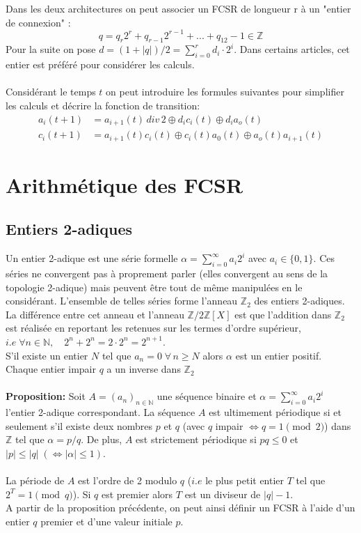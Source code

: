 \documentclass[11pt]{report}
\begin{document}
	Dans les deux architectures on peut associer un FCSR de longueur r à un "entier de connexion" : 
	$$
	q = q_r2^r + q_{r-1}2^{r-1} + ... + q_12 - 1 \in 
	\mathbb{Z}
	$$
	Pour la suite on pose $d = (1+|q|)/2 = \sum_{i=0}^rd_i \cdot 2^i$. Dans certains articles, cet entier est préféré pour considérer les calculs.
	\\\\
	Considérant le temps $t$ on peut introduire les formules suivantes pour simplifier les calculs et décrire la fonction de transition: 
	\begin{align*}
		a_i(t+1) &= a_{i+1}(t) \, div \, 2 \oplus d_ic_i(t) \oplus d_ia_o(t)\\
		c_i(t+1) &= a_{i+1}(t)c_i(t) \oplus c_i(t)a_0(t) \oplus a_o(t)a_{i+1}(t)
	\end{align*}
		
\chapter{Arithmétique des FCSR}	
	\section{Entiers 2-adiques}
	
	Un entier 2-adique est une série formelle $\alpha = \sum_{i=0}^\infty a_i2^i$ avec $a_i \in \{0,1\}$.
	Ces séries ne convergent pas à proprement parler (elles convergent au sens de la topologie 2-adique) mais peuvent être tout de même manipulées en le considérant. L'ensemble de telles séries forme l'anneau $\mathbb{Z}_2$ des entiers 2-adiques. La différence entre cet anneau et l'anneau $\mathbb{Z}/2\mathbb{Z}[X]$ est que l'addition dans $\mathbb{Z}_2$ est réalisée en reportant les retenues sur les termes d'ordre supérieur, $i.e\;\forall n \in \mathbb{N},\quad 2^n+2^n = 2 \cdot 2^n = 2^{n+1}$.
	\\
	S'il existe un entier $N$ tel que $a_n=0 \; \forall \, n \geq N$ alors $\alpha$ est un entier positif. Chaque entier impair $q$ a un inverse dans $\mathbb{Z}_2$
	\\
	\\
	\textbf{Proposition:} Soit $A=(a_n)_{n \in \mathbb{N}}$ une séquence binaire et $\alpha = \sum_{i=0}^\infty a_i2^i$ l'entier 2-adique correspondant. La séquence $A$ est ultimement périodique si et seulement s'il existe deux nombres $p$ et $q$ (avec $q$ impair $\iff q=1\pmod{2}$)  dans $\mathbb{Z}$ tel que $\alpha = p/q$. De plus, $A$ est strictement périodique si $pq \leq 0$ et $|p| \leq |q| \;(\iff |\alpha| \leq 1)$.
	\\
	\\
	La période de $A$ est l'ordre de 2 modulo $q$ ($i.e$ le plus petit entier $T$ tel que $2^T = 1\pmod{q}$). Si $q$ est premier alors $T$ est un diviseur de $|q| - 1$. 
	\\
	A partir de la proposition précédente, on peut ainsi définir un FCSR à l'aide d'un entier $q$ premier et d'une valeur initiale $p$.
	
\end{document}
